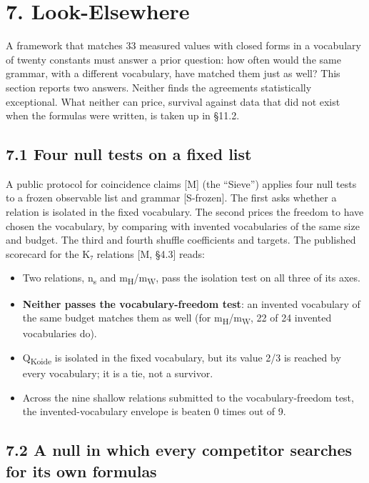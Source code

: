 \documentclass[11pt,a4paper]{article}
\begin{document}
\section{7. Look-Elsewhere}\label{look-elsewhere}

A framework that matches 33 measured values with closed forms in a vocabulary of twenty constants must answer a prior question: how often would the same grammar, with a different vocabulary, have matched them just as well? This section reports two answers. Neither finds the agreements statistically exceptional. What neither can price, survival against data that did not exist when the formulas were written, is taken up in §11.2.

\subsection{7.1 Four null tests on a fixed list}\label{four-null-tests-on-a-fixed-list}

A public protocol for coincidence claims {[}M{]} (the ``Sieve'') applies four null tests to a frozen observable list and grammar {[}S-frozen{]}. The first asks whether a relation is isolated in the fixed vocabulary. The second prices the freedom to have chosen the vocabulary, by comparing with invented vocabularies of the same size and budget. The third and fourth shuffle coefficients and targets. The published scorecard for the K₇ relations {[}M, §4.3{]} reads:

\begin{itemize}
\tightlist
\item
  Two relations, n\textsubscript{s} and m\textsubscript{H}/m\textsubscript{W}, pass the isolation test on all three of its axes.
\item
  \textbf{Neither passes the vocabulary-freedom test}: an invented vocabulary of the same budget matches them as well (for m\textsubscript{H}/m\textsubscript{W}, 22 of 24 invented vocabularies do).
\item
  Q\textsubscript{Koide} is isolated in the fixed vocabulary, but its value 2/3 is reached by every vocabulary; it is a tie, not a survivor.
\item
  Across the nine shallow relations submitted to the vocabulary-freedom test, the invented-vocabulary envelope is beaten 0 times out of 9.
\end{itemize}

\subsection{7.2 A null in which every competitor searches for its own formulas}\label{a-null-in-which-every-competitor-searches-for-its-own-formulas}
\end{document}
